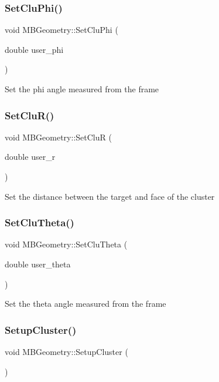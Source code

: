 \subsubsection{\texorpdfstring{Set\+Clu\+Phi()}{SetCluPhi()}}
{\footnotesize\ttfamily void M\+B\+Geometry\+::\+Set\+Clu\+Phi (\begin{DoxyParamCaption}\item[{double}]{user\+\_\+phi }\end{DoxyParamCaption})}

Set the phi angle measured from the frame \mbox{\label{class_m_b_geometry_a292c4326421c78871667e91c3694ae35}} 
\subsubsection{\texorpdfstring{Set\+Clu\+R()}{SetCluR()}}
{\footnotesize\ttfamily void M\+B\+Geometry\+::\+Set\+CluR (\begin{DoxyParamCaption}\item[{double}]{user\+\_\+r }\end{DoxyParamCaption})}

Set the distance between the target and face of the cluster \mbox{\label{class_m_b_geometry_a9a2a8c9609141be92d7ba30e6087aa30}} 
\subsubsection{\texorpdfstring{Set\+Clu\+Theta()}{SetCluTheta()}}
{\footnotesize\ttfamily void M\+B\+Geometry\+::\+Set\+Clu\+Theta (\begin{DoxyParamCaption}\item[{double}]{user\+\_\+theta }\end{DoxyParamCaption})}

Set the theta angle measured from the frame \mbox{\label{class_m_b_geometry_a4d98a38f0dc1ca6a4a73477dde5cdd8d}} 
\subsubsection{\texorpdfstring{Setup\+Cluster()}{SetupCluster()}\hspace{0.1cm}{\footnotesize\ttfamily [1/2]}}
{\footnotesize\ttfamily void M\+B\+Geometry\+::\+Setup\+Cluster (\begin{DoxyParamCaption}{ }\end{DoxyParamCaption})}

